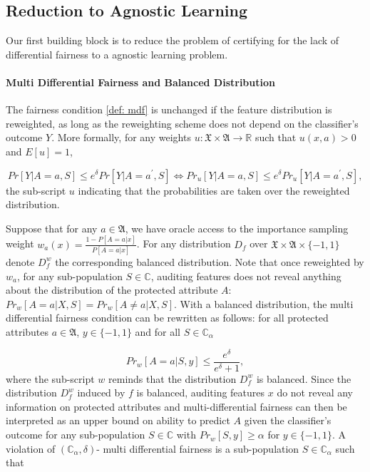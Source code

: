 \documentclass{article}
\begin{document}
\subsection{Reduction to Agnostic Learning}
Our first building block is to reduce the problem of certifying for the lack of differential fairness to a agnostic learning problem. 

\paragraph{Multi Differential Fairness and Balanced Distribution}
The fairness condition \ref{def: mdf} is unchanged if the feature distribution is reweighted, as long as the reweighting scheme does not depend on the classifier's outcome $Y$. More formally, for any weights $u: \mathfrak{X}\times \mathfrak{A} \rightarrow \mathbb{R}$ such that $u(x,a)> 0$ and $E[u]=1$, 

\begin{equation}
Pr[Y|A=a, S] \leq e^{\delta} Pr[Y|A=a^{'}, S] \iff Pr_{u}[Y|A=a, S] \leq e^{\delta} Pr_{u}[Y|A=a^{'}, S],
\end{equation}
the sub-script $u$ indicating that the probabilities are taken over the reweighted distribution. 

\bigskip
Suppose that for any $a \in \mathfrak{A}$, we have oracle access to the importance sampling weight $w_{a}(x)=\frac{1 - P[A=a|x]}{P[A=a|x]}$. For any distribution $D_{f}$ over $\mathfrak{X} \times \mathfrak{A}\times \{-1, 1\}$ denote $D_{f}^{w}$ the corresponding balanced distribution. Note that once reweighted by $w_{a}$, for any sub-population $S\in \mathbb{C}$, auditing features does not reveal anything about the distribution of the protected attribute $A$: $Pr_{w}[A=a|X, S]=Pr_{w}[A\neq a|X, S]$. With a balanced distribution, the multi differential fairness condition can be rewritten as follows: for all protected attributes $a\in \mathfrak{A}$, $y\in \{-1,1\}$ and for all $S\in \mathbb{C}_{\alpha}$

\begin{equation}
    \label{eq: mdf_w}
    Pr_{w}[A=a |S, y] \leq \frac{e^{\delta}}{e^{\delta} + 1},
\end{equation}
where the sub-script $w$ reminds that the distribution $D_{f}^{w}$ is balanced. Since the distribution $D_{f}^{w}$ induced by $f$ is balanced, auditing features $x$ do not reveal any information on protected attributes and multi-differential fairness can then be interpreted as an upper bound on ability to predict $A$ given the classifier's outcome for any sub-population $S\in \mathbb{C}$ with $Pr_{w}[S, y] \geq \alpha$ for $y\in\{-1, 1\}$.  A violation of $(\mathbb{C}_{\alpha}, \delta)$- multi differential fairness is a sub-population $S\in \mathbb{C}_{\alpha}$ such that 
\end{document}
